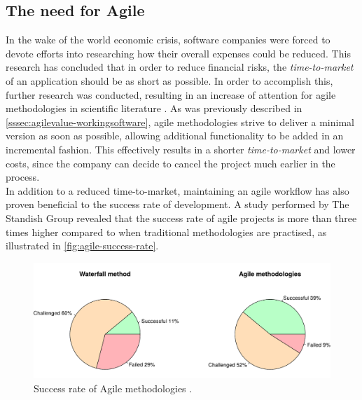 
\subsection{The need for Agile}
In the wake of the world economic crisis, software companies were forced to devote efforts into researching how their overall expenses could be reduced. This research has concluded that in order to reduce financial risks, the \emph{time-to-market} of an application should be as short as possible. In order to accomplish this, further research was conducted, resulting in an increase of attention for agile methodologies in scientific literature \cite{ionel2009}. As was previously described in \autoref{sssec:agilevalue-workingsoftware}, agile methodologies strive to deliver a minimal version as soon as possible, allowing additional functionality to be added in an incremental fashion. This effectively results in a shorter \emph{time-to-market} and lower costs, since the company can decide to cancel the project much earlier in the process.\\

\noindent In addition to a reduced time-to-market, maintaining an agile workflow has also proven beneficial to the success rate of development. A study performed by The Standish Group revealed that the success rate of agile projects is more than three times higher compared to when traditional methodologies are practised, as illustrated in \autoref{fig:agile-success-rate}. 

\begin{figure}[htbp!]
	\centering
	\includegraphics[width=\textwidth]{assets/charts/agile-success-rate.pdf}
	\caption{Success rate of Agile methodologies \cite{standish2015chaos}.}
	\label{fig:agile-success-rate}
\end{figure}